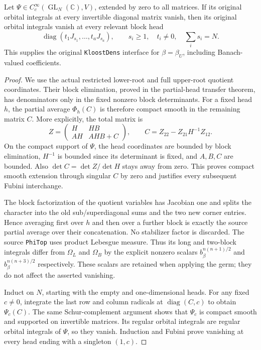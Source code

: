 \begin{theorem}\label{terminal-density-all-heads}
Let $\Psi\in C_c^\infty(\operatorname{GL}_N(\mathbb C),V)$,
extended by zero to all matrices.  If its original orbital
integrals at every invertible diagonal matrix vanish, then its
original orbital integrals vanish at every relevant block head
\[
       \operatorname{diag}(t_1J_{s_1},\ldots,t_aJ_{s_a}),
       \qquad s_i\ge1,\quad t_i\ne0,\quad\sum_i s_i=N.
\]
This supplies the original \texttt{KloostDens} interface for
$\beta=\beta_U$, including Banach-valued coefficients.
\end{theorem}

\begin{proof}
We use the actual restricted lower-root and full upper-root
quotient coordinates.  Their block elimination, proved in the
partial-head transfer theorem, has denominators only in the
fixed nonzero block determinants.  For a fixed head $h$, the
partial average $\Phi_h(C)$ is therefore compact smooth in the
remaining matrix $C$.  More explicitly, the total matrix is
\[
 Z=\begin{pmatrix}H&HB\\AH&AHB+C\end{pmatrix},
 \qquad C=Z_{22}-Z_{21}H^{-1}Z_{12}.
\]
On the compact support of $\Psi$, the head coordinates are
bounded by block elimination, $H^{-1}$ is bounded since its
determinant is fixed, and $A,B,C$ are bounded.  Also
$\det C=\det Z/\det H$ stays away from zero.  This proves
compact smooth extension through singular $C$ by zero and
justifies every subsequent Fubini interchange.

The block factorization of the quotient variables has Jacobian
one and splits the character into the old sub/superdiagonal sums
and the two new corner entries.  Hence averaging first over $h$
and then over a further block is exactly the source partial
average over their concatenation.  No stabilizer factor is
discarded.  The source \texttt{PhiTop} uses product Lebesgue
measure.  Thus its long and two-block integrals differ from
$\Omega_L$ and $\Omega_B$ by the explicit nonzero scalars
$b_\beta^{n(n+1)/2}$ and $b_\beta^{n(n+3)/2}$ respectively.
These scalars are retained when applying the germ; they do not
affect the asserted vanishing.

Induct on $N$, starting with the empty and one-dimensional heads.
For any fixed $c\ne0$, integrate the last row and column radicals
at $\operatorname{diag}(C,c)$ to obtain $\Psi_c(C)$.  The same
Schur-complement argument shows that $\Psi_c$ is compact smooth
and supported on invertible matrices.  Its regular orbital
integrals are regular orbital integrals of $\Psi$, so they
vanish.  Induction and Fubini prove vanishing at every head
ending with a singleton $(1,c)$.


\end{proof}
